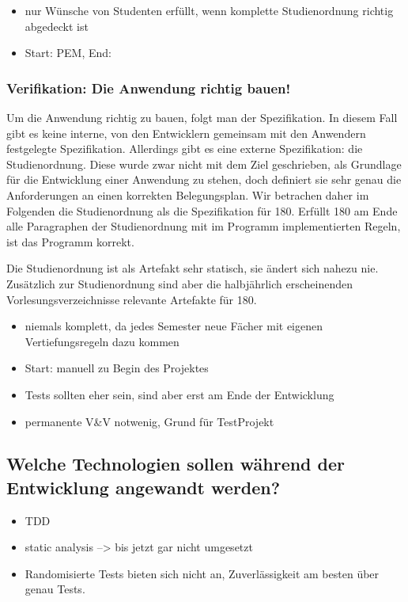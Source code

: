 \documentclass[ngerman]{article}
\begin{document}
\begin{itemize}
    \item nur Wünsche von Studenten erfüllt, wenn komplette Studienordnung richtig abgedeckt ist
    \item Start: PEM, End:
\end{itemize}

\subsubsection{Verifikation: Die Anwendung richtig bauen!}

Um die Anwendung richtig zu bauen, folgt man der Spezifikation.
In diesem Fall gibt es keine interne, von den Entwicklern gemeinsam mit den Anwendern festgelegte Spezifikation.
Allerdings gibt es eine externe Spezifikation: die Studienordnung.
Diese wurde zwar nicht mit dem Ziel geschrieben, als Grundlage für die Entwicklung einer Anwendung zu stehen, doch definiert sie sehr genau die Anforderungen an einen korrekten Belegungsplan.
Wir betrachen daher im Folgenden die Studienordnung als die Spezifikation für 180.
Erfüllt 180 am Ende alle Paragraphen der Studienordnung mit im Programm implementierten Regeln, ist das Programm korrekt.

Die Studienordnung ist als Artefakt sehr statisch, sie ändert sich nahezu nie.
Zusätzlich zur Studienordnung sind aber die halbjährlich erscheinenden Vorlesungsverzeichnisse relevante Artefakte für 180.

\begin{itemize}
    \item
        niemals komplett, da jedes Semester neue Fächer mit eigenen Vertiefungsregeln dazu kommen 
    \item
        Start: manuell zu Begin des Projektes
    \item
        Tests sollten eher sein, sind aber erst am Ende der Entwicklung
    \item
        permanente V\&V notwenig, Grund für TestProjekt
\end{itemize}

\subsection{Welche Technologien sollen während der Entwicklung angewandt werden?}

\begin{itemize}
    \item
        TDD
    \item
        static analysis --\textgreater{} bis jetzt gar nicht umgesetzt
    \item
        Randomisierte Tests bieten sich nicht an, Zuverlässigkeit am besten über genau Tests.
\end{itemize}
\end{document}
